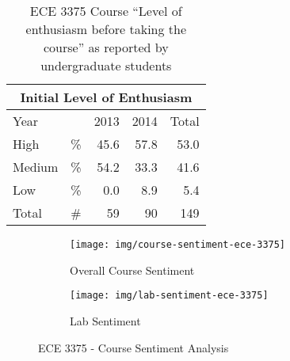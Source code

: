 \begin{table}[hb!]
    \centering
    \begin{tabular}{lc|r|r|r}
        \multicolumn{5}{c}{Initial Level of Enthusiasm} \\ \hline\hline
        \multicolumn{2}{l}{Year} & \multicolumn{1}{|c}{2013} & \multicolumn{1}{|c}{2014} & \multicolumn{1}{|c}{Total} \\ \hline
        High          & \%       & 45.6                     & 57.8                     & 53.0                      \\ 
        Medium        & \%       & 54.2                     & 33.3                     & 41.6                      \\
        Low           & \%       & 0.0                      & 8.9                      & 5.4                       \\ 
        Total         & \#       & 59                       & 90                       & 149                       \\ \hline
    \end{tabular}
    \caption{ECE 3375 Course ``Level of enthusiasm before taking the course'' as reported by undergraduate students \cite{evals:ece3375-2013, evals:ece3375-2014}} 
    \label{table-course-enthusiasm-ece3375}
\end{table}


\begin{figure}
    \centering
    \begin{subfigure}{.8\linewidth}
        \centering
        \texttt{[image: img/course-sentiment-ece-3375]}
        \caption{Overall Course Sentiment}
        \label{fig:ece-3375-course-sentiment}
    \end{subfigure}
    
    \begin{subfigure}{.8\linewidth}
        \centering
        \texttt{[image: img/lab-sentiment-ece-3375]}
        \caption{Lab Sentiment}
        \label{fig:ece-3375-lab-sentiment}
    \end{subfigure}
    
    \caption{ECE 3375 - Course Sentiment Analysis\cite{evals:ece3375-2013, evals:ece3375-2014}}
\end{figure}

